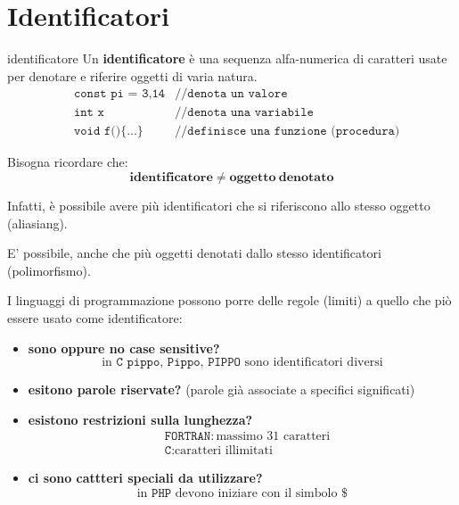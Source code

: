 
\chapter{Identificatori}
\begin{mydef}{identificatore}
    Un \textbf{identificatore} è una sequenza alfa-numerica di caratteri usate per denotare e riferire oggetti di varia natura.
    \[
        \begin{aligned}
            &\texttt{const pi = 3,14} &\texttt{//denota un valore}\\
            &\texttt{int x} &\texttt{//denota una variabile}\\
            &\texttt{void f()\{...\}} & \texttt{//definisce una funzione (procedura)}
        \end{aligned}
    \]
\end{mydef}

Bisogna ricordare che:
\[
    \mathbf{identificatore} \neq \mathbf{oggetto \ denotato}
\]

Infatti, è possibile avere più identificatori che si riferiscono allo stesso oggetto (aliasiang).


E' possibile, anche che più oggetti denotati dallo stesso identificatori (polimorfismo).

\medskip
I linguaggi di programmazione possono porre delle regole (limiti) a quello che piò essere usato come identificatore:
\begin{itemize}[label=$\triangleright$, itemsep=\smallskipamount]
    \item \textbf{sono oppure no case sensitive?}
    \[
        \text{in } \texttt{C pippo, Pippo, PIPPO } \text{sono identificatori diversi}
    \]
    \item \textbf{esitono parole riservate?} (parole già associate a specifici significati)
    \item \textbf{esistono restrizioni sulla lunghezza?}
    \[
        \begin{aligned}
            &\texttt{FORTRAN}: \text{massimo } 31 \text{ caratteri}\\
            &\texttt{C}: \text{caratteri illimitati}
        \end{aligned}
    \]
    \item \textbf{ci sono cattteri speciali da utilizzare?}
    \[
        \text{in } \texttt{PHP } \text{devono iniziare con il simbolo } \$
    \]
\end{itemize}

